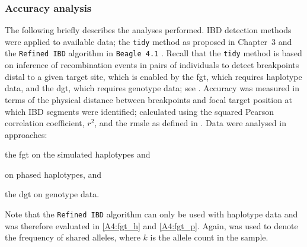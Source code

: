 


%
\subsubsection{Accuracy analysis}
%

The following briefly describes the analyses performed.
 IBD detection methods were applied to available data; the \texttt{tidy} method as proposed in Chapter~3 and the \texttt{Refined\,IBD} algorithm in \texttt{Beagle\,4.1} \citep{Browning:2013eh}.
Recall that the \texttt{tidy} method is based on inference of recombination events in pairs of individuals to detect breakpoints distal to a given target site, which is enabled by the \gls{fgt}, which requires haplotype data, and the \gls{dgt}, which requires genotype data; see .
Accuracy was measured in terms of the physical distance between breakpoints and focal target position at which IBD segments were identified; calculated using the squared Pearson correlation coefficient, $r^2$, and the \gls{rmsle} as defined in .
Data were analysed in  approaches:
\begin{approach_}
\item\label{A4:fgt_h} the \gls{fgt} on the simulated haplotypes and
\item\label{A4:fgt_p} on phased haplotypes, and
\item\label{A4:dgt} the \gls{dgt} on genotype data.
\end{approach_}
Note that the \texttt{Refined\,IBD} algorithm can only be used with haplotype data and was therefore evaluated in \ref{A4:fgt_h} and \ref{A4:fgt_p}.
Again, \fk{} was used to denote the frequency of shared alleles, where $k$ is the allele count in the sample.



